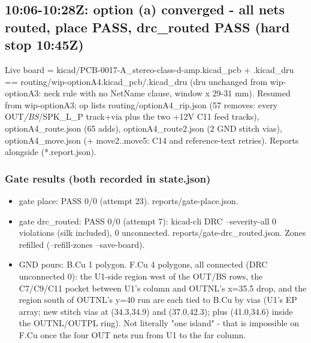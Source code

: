 \documentclass[11pt]{article}
\begin{document}
\subsection*{10:06-10:28Z: option (a) converged - all nets routed, place PASS, drc\_routed PASS (hard stop 10:45Z)}
Live board = kicad/PCB-0017-A\_stereo-class-d-amp.kicad\_pcb + .kicad\_dru == routing/wip-optionA4.kicad\_pcb/.kicad\_dru (dru unchanged from wip-optionA3: neck rule with no NetName clause, window x 29-31 mm). Resumed from wip-optionA3; op lists routing/optionA4\_rip.json (57 removes: every OUT\emph{/BS}/SPK\_L\_P track+via plus the two +12V C11 feed tracks), optionA4\_route.json (65 adds), optionA4\_route2.json (2 GND stitch vias), optionA4\_move.json (+ move2..move5: C14 and reference-text retries). Reports alongside ({*}.report.json).

\subsubsection*{Gate results (both recorded in state.json)}
\begin{itemize}
\item gate place: PASS 0/0 (attempt 23). reports/gate-place.json.
\item gate drc\_routed: PASS 0/0 (attempt 7): kicad-cli DRC --severity-all 0 violations (silk included),
0 unconnected. reports/gate-drc\_routed.json. Zones refilled (--refill-zones --save-board).
\item GND pours: B.Cu 1 polygon. F.Cu 4 polygons, all connected (DRC unconnected 0): the U1-side region
west of the OUT/BS rows, the C7/C9/C11 pocket between U1's column and OUTNL's x=35.5 drop, and the
region south of OUTNL's y=40 run are each tied to B.Cu by vias (U1's EP array; new stitch vias at
(34.3,34.9) and (37.0,42.3); plus (41.0,34.6) inside the OUTNL/OUTPL ring). Not literally "one
island" - that is impossible on F.Cu once the four OUT nets run from U1 to the far column.
\end{itemize}
\end{document}
